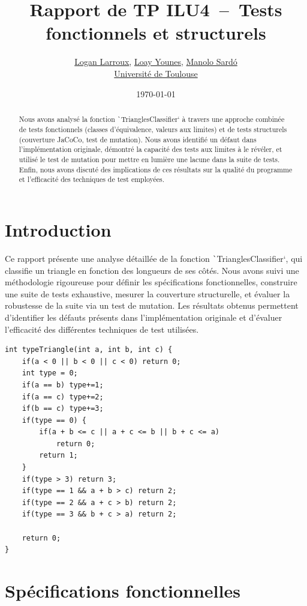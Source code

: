 \documentclass[a4paper,11pt]{article}
\title{Rapport de TP ILU4~--~Tests fonctionnels et structurels}
\author{\href{mailto:loganlarrouxpro@gmail.com}{Logan Larroux}, \href{mailto:loay.younes@utoulouse.fr}{Loay Younes}, \href{mailto:manolo.sardo@example.com}{Manolo Sardó}\\\href{https://univ-tlse3.fr}{Université de Toulouse}}
\date{\today}
\begin{document}
\maketitle
\tableofcontents

\begin{abstract}
    Nous avons analysé la fonction \texttt`TrianglesClassifier` à travers une approche combinée de tests fonctionnels (classes d'équivalence, valeurs aux limites) et de tests structurels (couverture JaCoCo, test de mutation). Nous avons identifié un défaut dans l'implémentation originale, démontré la capacité des tests aux limites à le révéler, et utilisé le test de mutation pour mettre en lumière une lacune dans la suite de tests. Enfin, nous avons discuté des implications de ces résultats sur la qualité du programme et l'efficacité des techniques de test employées.
\end{abstract}

\newpage

\section*{Introduction}

Ce rapport présente une analyse détaillée de la fonction \texttt`TrianglesClassifier`, qui classifie un triangle en fonction des longueurs de ses côtés. Nous avons suivi une méthodologie rigoureuse pour définir les spécifications fonctionnelles, construire une suite de tests exhaustive, mesurer la couverture structurelle, et évaluer la robustesse de la suite via un test de mutation. Les résultats obtenus permettent d'identifier les défauts présents dans l'implémentation originale et d'évaluer l'efficacité des différentes techniques de test utilisées.

\begin{verbatim}
int typeTriangle(int a, int b, int c) {
    if(a < 0 || b < 0 || c < 0) return 0;
    int type = 0;
    if(a == b) type+=1;
    if(a == c) type+=2;
    if(b == c) type+=3;
    if(type == 0) {
        if(a + b <= c || a + c <= b || b + c <= a)
            return 0;
        return 1;
    }
    if(type > 3) return 3;
    if(type == 1 && a + b > c) return 2;
    if(type == 2 && a + c > b) return 2;
    if(type == 3 && b + c > a) return 2;
    
    return 0;
}
\end{verbatim}

\section{Spécifications fonctionnelles}
\end{document}
